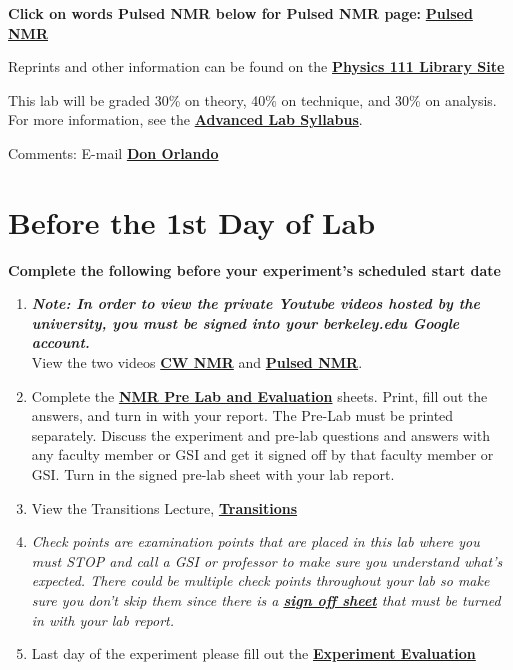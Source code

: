 \documentclass{../lab}
\begin{document}
\textbf{Click on words Pulsed NMR below for Pulsed NMR page:  }\href{http://experimentationlab.berkeley.edu/PulsedNMR}{\textbf{Pulsed NMR}}

Reprints and other information can be found on the \href{http://physics111.lib.berkeley.edu/Physics111/Reprints/NMR/NMR\_index.html}{\textbf{Physics 111 Library Site}}

This lab will be graded 30\% on theory, 40\% on technique, and 30\% on analysis. For more information, see the \href{\AdvancedLabSyllabus}{\textbf{Advanced Lab Syllabus}}.

Comments: E-mail \href{\MailDonOrlando}{\textbf{Don Orlando}}

\section{Before the 1st Day of Lab}

\textbf{Complete the following before your experiment's scheduled start date}

\begin{enumerate}
    \item \emph{\textbf{Note: In order to view the private Youtube videos hosted by the university, you must be signed into your berkeley.edu Google account.}}\\
    View the two videos \href{http://youtu.be/q\_Rtbr7YEJY}{\textbf{CW NMR}} and \href{http://youtu.be/\_sXDn-ChOUY}{\textbf{Pulsed NMR}}.

    \item Complete the \href{http://experimentationlab.berkeley.edu/NMRPreLab}{\textbf{NMR Pre Lab and Evaluation}} sheets. Print, fill out the answers, and turn in with your report. The Pre-Lab must be printed separately. Discuss the experiment and pre-lab questions and answers with any faculty member or GSI and get it signed off by that faculty member or GSI. Turn in the signed pre-lab sheet with your lab report.

    \item View the Transitions Lecture, \href{http://youtu.be/xOMgdVP3AfE}{\textbf{Transitions}}

    \item \emph{Check points are examination points that are placed in this lab where you must STOP and call a GSI or professor to make sure you understand what's expected. There could  be multiple check points throughout your lab so make sure you don't skip them since there is a \href{http://experimentationlab.berkeley.edu/nmrcheckpoints}{\textbf{sign off sheet}} that must be turned in with your lab report.}

    \item Last day of the experiment please fill out the \href{\ExperimentEvaluation}{\textbf{Experiment Evaluation}}

\end{enumerate}
\end{document}
